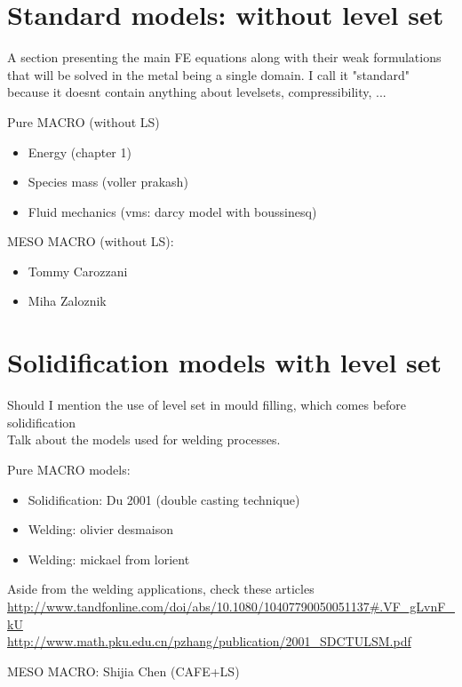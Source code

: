 \section{Standard models: without level set}
A section presenting the main FE equations along with their weak formulations that will be solved 
in the metal being a single domain. I call it "standard" because it doesnt contain anything about 
levelsets, compressibility, ...

Pure MACRO (without LS)
\begin{itemize}
\item Energy (chapter 1)
\item Species mass (voller prakash) 
\item Fluid mechanics (vms: darcy model with boussinesq)
\end{itemize}

MESO MACRO (without LS): 
\begin{itemize}
\item Tommy Carozzani
\item Miha Zaloznik
\end{itemize}

\section{Solidification models with level set}
Should I mention the use of level set in mould filling, which comes before solidification \\
Talk about the models used for welding processes. 

Pure MACRO models:
\begin{itemize}
\item Solidification: Du 2001 (double casting technique)
\item Welding: olivier desmaison
\item Welding: mickael from lorient 
\end{itemize}
Aside from the welding applications, check these articles
\url{http://www.tandfonline.com/doi/abs/10.1080/10407790050051137#.VF_gLvnF_kU} \\
\url{http://www.math.pku.edu.cn/pzhang/publication/2001_SDCTULSM.pdf}

MESO MACRO: Shijia Chen (CAFE+LS)

